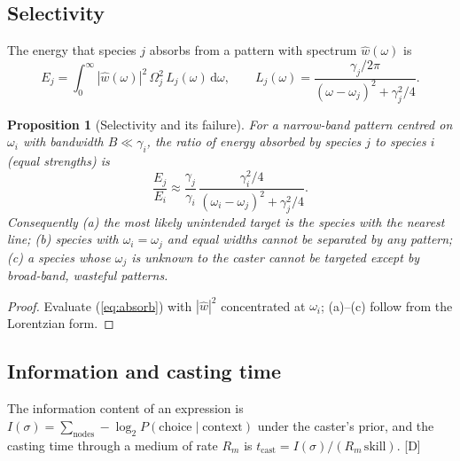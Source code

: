 \documentclass[11pt,a4paper]{article}
\numberwithin{equation}{section}
\theoremstyle{definition}
\theoremstyle{plain}
\newtheorem{proposition}[definition]{Proposition}
\theoremstyle{remark}
\newcommand{\dd}{\mathrm d}
\newcommand{\abs}[1]{\left\lvert #1\right\rvert}
\newcommand{\tagD}{\textcolor{tag}{\textsf{[D]}}}
\begin{document}
\subsection{Selectivity}\label{sec:select}
The energy that species $j$ absorbs from a pattern with spectrum $\hat w(\omega)$ is
\begin{equation}\label{eq:absorb}
E_j=\int_0^\infty \abs{\hat w(\omega)}^2\,\Omega_j^2\, L_j(\omega)\,\dd\omega,\qquad
L_j(\omega)=\frac{\gamma_j/2\pi}{(\omega-\omega_j)^2+\gamma_j^2/4}.
\end{equation}
\begin{proposition}[Selectivity and its failure]\label{prop:select}
For a narrow-band pattern centred on $\omega_i$ with bandwidth $B\ll\gamma_i$, the ratio of energy absorbed by species $j$ to species $i$ (equal strengths) is
\begin{equation}
\frac{E_j}{E_i}\approx\frac{\gamma_j}{\gamma_i}\,\frac{\gamma_i^2/4}{(\omega_i-\omega_j)^2+\gamma_j^2/4}.
\end{equation}
Consequently (a) the most likely unintended target is the species with the nearest line; (b) species with $\omega_i=\omega_j$ and equal widths cannot be separated by any pattern; (c) a species whose $\omega_j$ is unknown to the caster cannot be targeted except by broad-band, wasteful patterns.
\end{proposition}
\begin{proof}
Evaluate (\ref{eq:absorb}) with $\abs{\hat w}^2$ concentrated at $\omega_i$; (a)--(c) follow from the Lorentzian form.
\end{proof}

\subsection{Information and casting time}
The information content of an expression is $I(\sigma)=\sum_{\text{nodes}}-\log_2 P(\text{choice}\mid\text{context})$ under the caster's prior, and the casting time through a medium of rate $R_m$ is $t_{\text{cast}}=I(\sigma)/(R_m\,\text{skill})$. \tagD
\end{document}
